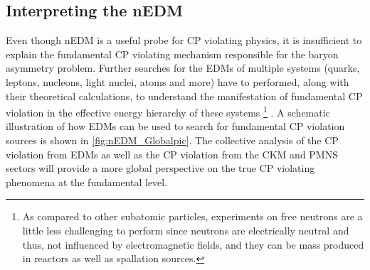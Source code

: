 \subsection{Interpreting the nEDM}

Even though nEDM is a useful probe for CP violating physics, it is insufficient to explain the fundamental CP violating mechanism responsible for the baryon asymmetry problem. Further searches for the EDMs of multiple systems (quarks, leptons, nucleons, light nuclei, atoms and more) have to performed, along with their theoretical calculations, to understand the manifestation of fundamental CP violation in the effective energy hierarchy of these systems \footnote{As compared to other subatomic particles, experiments on free neutrons are a little less challenging to perform since neutrons are electrically neutral \cite{Chadwick1932} and thus, not influenced by electromagnetic fields, and they can be mass produced in reactors as well as spallation sources.} \cite{Chupp2019}. A schematic illustration of how EDMs can be used to search for fundamental CP violation sources is shown in \cref{fig:nEDM_Globalpic}. The collective analysis of the CP violation from EDMs as well as the CP violation from the CKM and PMNS sectors will provide a more global perspective on the true CP violating phenomena at the fundamental level. 


